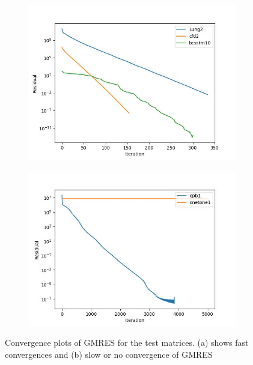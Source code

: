 \documentclass{article}
\begin{document}
\begin{figure}[htbp]
    \begin{minipage}[b]{0.5\linewidth}
        \centering
        \begin{subfigure}{\linewidth}
            \includegraphics[width=\linewidth]{residuals_fast.jpg}
            \caption{}
            \label{fig:subfig1}
        \end{subfigure}
        \label{fig:fast}
    \end{minipage}%
    \begin{minipage}[b]{0.5\linewidth}
        \centering
        \begin{subfigure}{\linewidth}
            \includegraphics[width=\linewidth]{residuals_slow.jpg}
            \caption{}
            \label{fig:subfig2}
        \end{subfigure}
        \label{fig:slow}
    \end{minipage}
    \caption{Convergence plots of GMRES for the test matrices. (a) shows fast convergences and (b) slow or no convergence of GMRES}
    \label{fig:convergences}
\end{figure}
\end{document}
